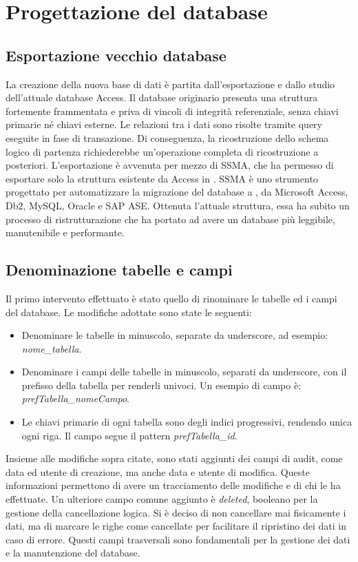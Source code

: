 \chapter{Progettazione del database}\label{chap:Database}
\section{Esportazione vecchio database}
La creazione della nuova base di dati è partita dall'esportazione e dallo studio dell'attuale database Access.
Il database originario presenta una struttura fortemente frammentata e priva di vincoli
di integrità referenziale, senza chiavi primarie né chiavi esterne.
Le relazioni tra i dati sono risolte tramite query eseguite in fase di transazione.
Di conseguenza, la ricostruzione dello schema logico di partenza richiederebbe
un'operazione completa di ricostruzione a posteriori.
L'esportazione è avvenuta per mezzo di \ac{SSMA},
che ha permesso di esportare solo la struttura esistente da Access in \sqlserver{}.
\ac{SSMA} è uno strumento progettato per automatizzare la migrazione del database a \sqlserver{},
da Microsoft Access, Db2, MySQL, Oracle e SAP ASE\cite{SQLServerMigrationAssistant}.
Ottenuta l'attuale struttura, essa ha subito un processo di ristrutturazione
che ha portato ad avere un database più leggibile, manutenibile e performante.
\section{Denominazione tabelle e campi}
Il primo intervento effettuato è stato quello di rinominare le tabelle ed i campi del database.
Le modifiche adottate sono state le seguenti:
\begin{itemize}
    \item Denominare le tabelle in minuscolo, separate da underscore, ad esempio: \textit{nome\_tabella}.
    \item Denominare i campi delle tabelle in minuscolo, separati da underscore, con
          il prefisso della tabella per renderli univoci. Un esempio di campo è: \textit{prefTabella\_nomeCampo}.
    \item Le chiavi primarie di ogni tabella sono degli indici progressivi, rendendo unica ogni riga.
          Il campo segue il pattern \textit{prefTabella\_id}.
\end{itemize}
Insieme alle modifiche sopra citate, sono stati aggiunti dei campi di audit,
come data ed utente di creazione, ma anche data e utente di modifica.
Queste informazioni permettono di avere un tracciamento delle modifiche e di chi le ha effettuate.
Un ulteriore campo comune aggiunto è \textit{deleted},
booleano per la gestione della cancellazione logica.
Si è deciso di non cancellare mai fisicamente i dati, ma di marcare le righe come cancellate
per facilitare il ripristino dei dati in caso di errore.
Questi campi trasversali sono fondamentali per la gestione dei dati
e la manutenzione del database.
